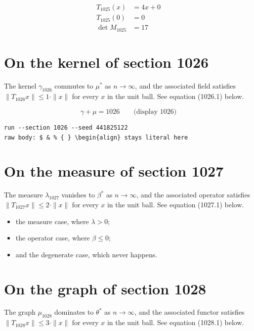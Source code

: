 \documentclass{article}
\begin{document}
\begin{align}
T_{1025}(x) &= 4 x + 0 \\
T_{1025}(0) &= 0 \\
\det M_{1025} &= 17
\end{align}

\section{On the kernel of section 1026}
The kernel $\gamma_{1026}$ commutes to $\mu^{*}$ as $n \to \infty$,
and the associated field satisfies $\|T_{1026} x\| \leq 1 \cdot \|x\|$
for every $x$ in the unit ball. See equation (1026.1) below.

$$
\gamma + \mu = 1026 \qquad \text{(display 1026)}
$$

\begin{verbatim}
run --section 1026 --seed 441825122
raw body: $ & % { } \begin{align} stays literal here
\end{verbatim}

\section{On the measure of section 1027}
The measure $\lambda_{1027}$ vanishes to $\beta^{*}$ as $n \to \infty$,
and the associated operator satisfies $\|T_{1027} x\| \leq 2 \cdot \|x\|$
for every $x$ in the unit ball. See equation (1027.1) below.

\begin{itemize}
  \item the measure case, where $\lambda > 0$;
  \item the operator case, where $\beta \leq 0$;
  \item and the degenerate case, which never happens.
\end{itemize}

\section{On the graph of section 1028}
The graph $\mu_{1028}$ dominates to $\theta^{*}$ as $n \to \infty$,
and the associated functor satisfies $\|T_{1028} x\| \leq 3 \cdot \|x\|$
for every $x$ in the unit ball. See equation (1028.1) below.
\end{document}

